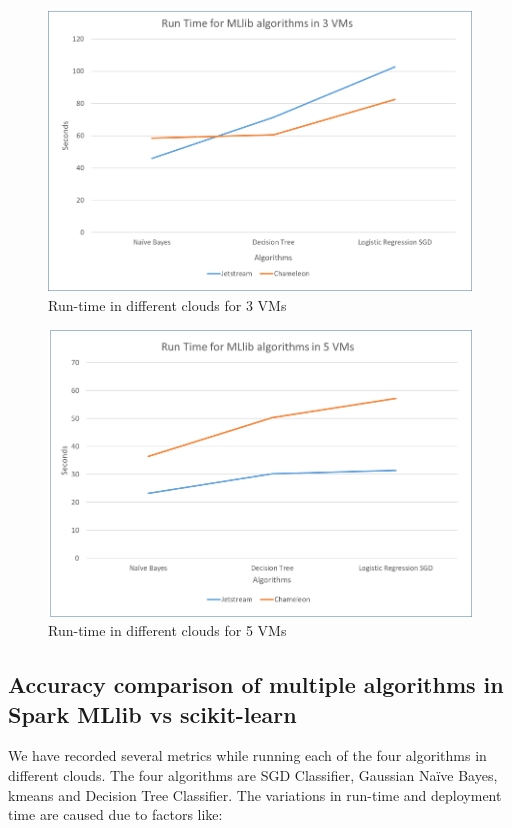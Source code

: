 \documentclass[9pt,twocolumn,twoside]{styles/osajnl}
\begin{document}
\begin{figure}[h!]
\centering
\includegraphics[width=\linewidth]{images/algoruntime3.png}
\caption{Run-time in different clouds for 3 VMs}
\label{fig:bench1}
\end{figure}

\begin{figure}[h!]
	\centering
	\includegraphics[width=\linewidth]{images/algoruntime5.png}
	\caption{Run-time in different clouds for 5 VMs}
	\label{fig:bench2}
\end{figure}


\subsection{Accuracy comparison of multiple algorithms in Spark MLlib vs scikit-learn}

We have recorded several metrics while running each of the four algorithms in different clouds. The four algorithms are SGD Classifier, Gaussian Naïve Bayes, kmeans and Decision Tree Classifier.
The variations in run-time and deployment time are caused due to factors like:
\end{document}
